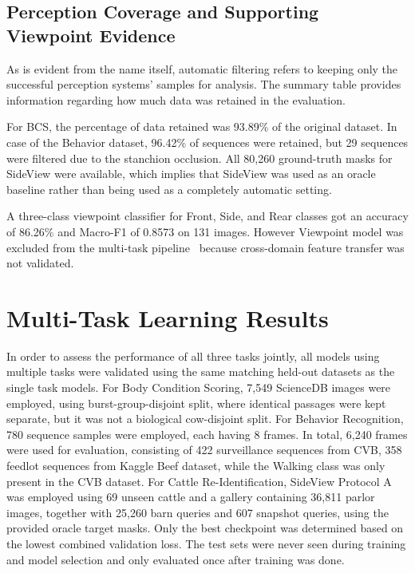 \subsection{Perception Coverage and Supporting Viewpoint Evidence}

As is evident from the name itself, automatic filtering refers to keeping only the successful perception systems' samples for analysis. The summary table provides information regarding how much data was retained in the evaluation.



For BCS, the percentage of data retained was 93.89\% of the original dataset. In case of the Behavior dataset, 96.42\% of sequences were retained, but 29 sequences were filtered due to the stanchion occlusion. All 80,260 ground-truth masks for SideView were available, which implies that SideView was used as an oracle baseline rather than being used as a completely automatic setting.

A three-class viewpoint classifier for Front, Side, and Rear classes got an accuracy of 86.26\% and Macro-F1 of 0.8573 on 131 images. However Viewpoint model was excluded from the multi-task pipeline~ because cross-domain feature transfer was not validated.

\section{Multi-Task Learning Results}

In order to assess the performance of all three tasks jointly, all models using multiple tasks were validated using the same matching held-out datasets as the single task models. For Body Condition Scoring, 7,549 ScienceDB images were employed, using burst-group-disjoint split, where identical passages were kept separate, but it was not a biological cow-disjoint split. For Behavior Recognition, 780 sequence samples were employed, each having 8 frames. In total, 6,240 frames were used for evaluation, consisting of 422 surveillance sequences from CVB, 358 feedlot sequences from Kaggle Beef dataset, while the Walking class was only present in the CVB dataset. For Cattle Re-Identification, SideView Protocol A was employed using 69 unseen cattle and a gallery containing 36,811 parlor images, together with 25,260 barn queries and 607 snapshot queries, using the provided oracle target masks. Only the best checkpoint was determined based on the lowest combined validation loss. The test sets were never seen during training and model selection and only evaluated once after training was done.

